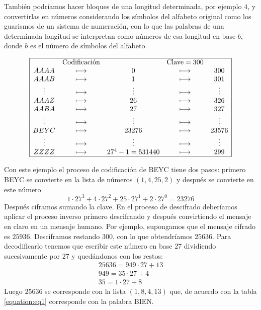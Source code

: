 También podríamos hacer bloques de una longitud determinada, por ejemplo $4$, y convertirlas en números considerando los símbolos del alfabeto original como los guarismos de un sistema de numeración, con lo que las palabras de una determinada longitud se interpretan como números de esa longitud en base $b$, donde $b$ es el número de símbolos del alfabeto.

$$\begin{array}[pos]{|ccccc|}
    \hline
           & \text{Codificación}  &                  & \text{Clave}=300 &         \\
    AAAA   & \longmapsto          & 0                & \longmapsto      & 300     \\
    AAAB   & \longmapsto          & 1                & \longmapsto      & 301     \\
    \vdots & \longmapsto          & \vdots           & \longmapsto      & \vdots  \\
    AAAZ   & \longmapsto          & 26               & \longmapsto      & 326     \\
    AABA   & \longmapsto          & 27               & \longmapsto      & 327     \\
    \vdots & \longmapsto          & \vdots           & \longmapsto      & \vdots  \\
    BEYC   & \longmapsto          & 23276            & \longmapsto      & 23576   \\
    \vdots & \longmapsto          & \vdots           & \longmapsto      & \vdots  \\
    ZZZZ   & \longmapsto          & 27^4 -1 = 531440 & \longmapsto      & 299     \\
    \hline
\end{array}$$

Con este ejemplo el proceso de codificación de BEYC tiene dos pasos: primero BEYC se convierte en la lista de números $(1,4,25,2)$ y después se convierte en este número
$$1\cdot 27^3 + 4\cdot 27^2 + 25\cdot 27^1 + 2\cdot 27^0 = 23276$$
Después ciframos sumando la clave. En el proceso de descifrado deberíamos aplicar el proceso inverso primero descifrando y después convirtiendo el mensaje en claro en un mensaje humano. Por ejemplo, supongamos que el mensaje cifrado es $25936$. Desciframos restando $300$, con lo que obtendríamos $25636$. Para decodificarlo tenemos que escribir este número en base $27$ dividiendo sucesivamente por $27$ y quedándonos con los restos:
\begin{gather*}
    25636 = 949\cdot 27 + 13 \\
    949   = 35\cdot 27 + 4 \\
    35    = 1\cdot 27 + 8
\end{gather*}
Luego $25636$ se corresponde con la lista $(1,8,4,13)$ que, de acuerdo con la tabla \ref{equation:eq1} corresponde con la palabra BIEN.

